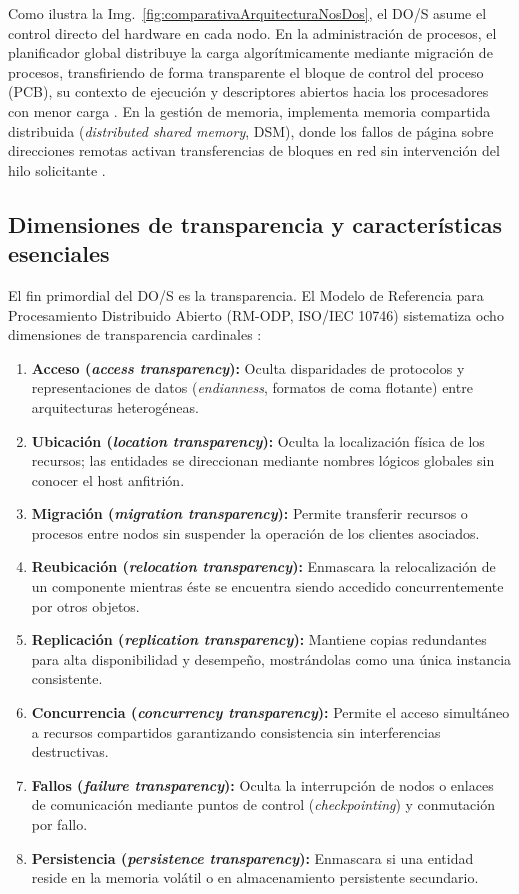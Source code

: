 \documentclass[12pt]{article}
\begin{document}
Como ilustra la Img.~\ref{fig:comparativaArquitecturaNosDos}, el DO/S asume el control directo del hardware en cada nodo. En la administración de procesos, el planificador global distribuye la carga algorítmicamente mediante migración de procesos, transfiriendo de forma transparente el bloque de control del proceso (PCB), su contexto de ejecución y descriptores abiertos hacia los procesadores con menor carga \parencite[\S 16.2, p.\ 563]{silberschatz2006fundamentos}. En la gestión de memoria, implementa memoria compartida distribuida (\textit{distributed shared memory}, DSM), donde los fallos de página sobre direcciones remotas activan transferencias de bloques en red sin intervención del hilo solicitante \parencite[\S 10, pp.\ 321--322]{mchoes2011sistemas}.

\subsection{Dimensiones de transparencia y características esenciales}
\label{sec:dimensionesTransparencia}

El fin primordial del DO/S es la transparencia. El Modelo de Referencia para Procesamiento Distribuido Abierto (RM-ODP, ISO/IEC 10746) sistematiza ocho dimensiones de transparencia cardinales \parencite[\S 17.2, pp.\ 786--787]{deitel2004operating}:
\begin{enumerate}[noitemsep, topsep=2pt, parsep=0pt]
    \item \textbf{Acceso (\textit{access transparency}):} Oculta disparidades de protocolos y representaciones de datos (\textit{endianness}, formatos de coma flotante) entre arquitecturas heterogéneas.
    \item \textbf{Ubicación (\textit{location transparency}):} Oculta la localización física de los recursos; las entidades se direccionan mediante nombres lógicos globales sin conocer el host anfitrión.
    \item \textbf{Migración (\textit{migration transparency}):} Permite transferir recursos o procesos entre nodos sin suspender la operación de los clientes asociados.
    \item \textbf{Reubicación (\textit{relocation transparency}):} Enmascara la relocalización de un componente mientras éste se encuentra siendo accedido concurrentemente por otros objetos.
    \item \textbf{Replicación (\textit{replication transparency}):} Mantiene copias redundantes para alta disponibilidad y desempeño, mostrándolas como una única instancia consistente.
    \item \textbf{Concurrencia (\textit{concurrency transparency}):} Permite el acceso simultáneo a recursos compartidos garantizando consistencia sin interferencias destructivas.
    \item \textbf{Fallos (\textit{failure transparency}):} Oculta la interrupción de nodos o enlaces de comunicación mediante puntos de control (\textit{checkpointing}) y conmutación por fallo.
    \item \textbf{Persistencia (\textit{persistence transparency}):} Enmascara si una entidad reside en la memoria volátil o en almacenamiento persistente secundario.
\end{enumerate}
\end{document}
